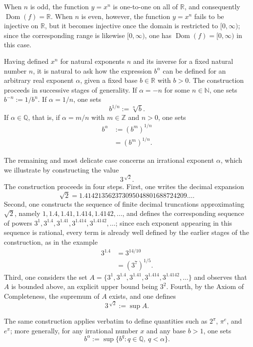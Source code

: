 When $n$ is odd, the function $y = x^n$ is one-to-one on all of $\mathbb{R}$, and consequently $\operatorname{Dom}(f) = \mathbb{R}$. When $n$ is even, however, the function $y = x^n$ fails to be injective on $\mathbb{R}$, but it becomes injective once the domain is restricted to $[0, \infty)$; since the corresponding range is likewise $[0, \infty)$, one has $\operatorname{Dom}(f) = [0, \infty)$ in this case.


Having defined $x^n$ for natural exponents $n$ and its inverse for a fixed natural number $n$, it is natural to ask how the expression $b^\alpha$ can be defined for an arbitrary real exponent $\alpha$, given a fixed base $b \in \mathbb{R}$ with $b > 0$. The construction proceeds in successive stages of generality. If $\alpha = -n$ for some $n \in \mathbb{N}$, one sets $b^{-n} := 1/b^n$. If $\alpha = 1/n$, one sets
\[
b^{1/n} := \sqrt[n]{b}.
\]
If $\alpha \in \mathbb{Q}$, that is, if $\alpha = m/n$ with $m \in \mathbb{Z}$ and $n > 0$, one sets
\[
\begin{aligned}
b^{\alpha} &:= (b^m)^{1/n} \\
&= (b^m)^{1/n}.
\end{aligned}
\]

The remaining and most delicate case concerns an irrational exponent $\alpha$, which we illustrate by constructing the value
\[
3^{\,\sqrt{2}}.
\]
The construction proceeds in four steps. First, one writes the decimal expansion
\[
\sqrt{2} = 1.414213562373095048801688724209\ldots.
\]
Second, one constructs the sequence of finite decimal truncations approximating $\sqrt{2}$, namely $1, 1.4, 1.41, 1.414, 1.4142, \ldots$, and defines the corresponding sequence of powers $3^1, 3^{1.4}, 3^{1.41}, 3^{1.414}, 3^{1.4142}, \ldots$; since each exponent appearing in this sequence is rational, every term is already well defined by the earlier stages of the construction, as in the example
\[
\begin{aligned}
3^{1.4} &= 3^{14/10} \\
&= (3^7)^{1/5}.
\end{aligned}
\]
Third, one considers the set $A = \{3^1, 3^{1.4}, 3^{1.41}, 3^{1.414}, 3^{1.4142}, \ldots\}$ and observes that $A$ is bounded above, an explicit upper bound being $3^2$. Fourth, by the Axiom of Completeness, the supremum of $A$ exists, and one defines
\[
3^{\,\sqrt{2}} := \sup A.
\]

The same construction applies verbatim to define quantities such as $2^\pi$, $\pi^e$, and $e^\pi$; more generally, for any irrational number $x$ and any base $b > 1$, one sets
\[
b^{\alpha} := \sup \{ b^q : q \in \mathbb{Q}, \ q < \alpha \}.
\]

